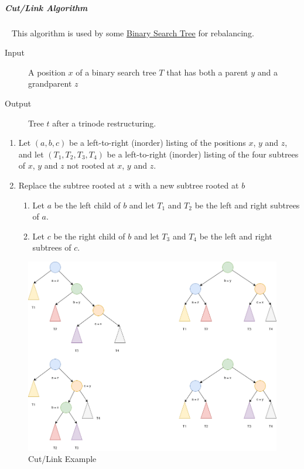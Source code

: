 \documentclass[11pt,twoside,twocolumn,landscape]{article}
\begin{document}
\subparagraph{Cut/Link Algorithm} \
\label{sec:org62588fb}
This algorithm is used by some \href{../../../roam/20211008140953-binary_search_tree.org}{Binary Search Tree} for rebalancing. 

\begin{description}
\item[{Input}] A position \(x\) of a binary search tree \(T\) that has both a parent \(y\) and a grandparent \(z\)
\item[{Output}] Tree \(t\) after a trinode restructuring.
\end{description}


\begin{enumerate}
\item Let \((a, b, c)\) be a left-to-right (inorder) listing of the positions \(x\), \(y\) and \(z\), and let \((T_1, T_2, T_3, T_4)\) be a left-to-right (inorder) listing of the four subtrees of \(x\), \(y\) and \(z\) not rooted at \(x\), \(y\) and \(z\).
\item Replace the subtree rooted at \(z\) with a new subtree rooted at \(b\)
\begin{enumerate}
\item Let \(a\) be the left child of \(b\) and let \(T_1\) and \(T_2\) be the left and right subtrees of \(a\).
\item Let \(c\) be the right child of \(b\) and let \(T_3\) and \(T_4\) be the left and right subtrees of \(c\).
\end{enumerate}
\end{enumerate}




\begin{figure}[htbp]
\centering
\includegraphics[width=.9\linewidth]{img/cut_link.drawio.png}
\caption{\label{fig:org672ed35}Cut/Link Example}
\end{figure}
\end{document}
